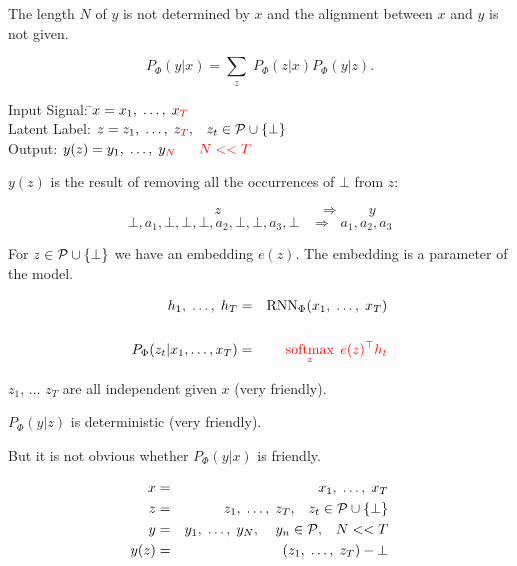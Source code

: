 {\vfill
{\color{red} The length $N$ of $y$ is not determined by $x$ and the alignment between $x$ and $y$ is not given.}


{\color{red} $$P_\Phi(y|x) = \sum_z\;P_\Phi(z|x)P_\Phi(y|z).$$}

\vfill
\begin{tabbing}
Input Signal: \hspace{3em} \=$x = x_1,\;\ldots,\;x_{\color{red} T}$ \\
Latent Label: \>$z = z_1,\;\ldots,\;z_{\color{red} T},\;\;\;z_t \in {\cal P} \cup \{\bot\}$ \\
Output: \>$y(z) = y_1,\;\ldots,\;y_{\color{red} N}\;\;\;\;\;\;{\color{red} N << T}$
\end{tabbing}

\vfill
$y(z)$ is the result of removing all the occurrences of $\bot$ from $z$:

{\color{red} $$\hspace{5em} z \hspace{7em} \Rightarrow \hspace{2em} y$$}
{\color{red} $$\bot,a_1,\bot,\bot,\bot,a_2,\bot,\bot,a_3,\bot \;\;\;\Rightarrow\;\; a_1,a_2,a_3$$}



For $z \in {\cal P} \cup \{\bot\}$ we have an embedding $e(z)$.  The embedding is a parameter of the model.

\begin{eqnarray*}
  h_1,\;\ldots,\;h_T & = & \mathrm{RNN}_\Phi(x_1,\;\ldots,\;x_T) \\
  \\
  P_\Phi(z_t|x_1,\ldots,x_T) & = & {\color{red} \operatorname*{softmax}_{z} \;e(z)^\top h_t}
\end{eqnarray*}

\vfill
$z_1$, $\ldots$ $z_T$ are {\color{red}  all independent} given $x$ (very friendly).

\vfill
$P_\Phi(y|z)$ is {\color{red} deterministic} (very friendly).

\vfill
{\color{red} But it is not obvious whether $P_\Phi(y|x)$ is friendly.}


\begin{eqnarray*}
  x & = & x_1,\;\ldots,\; x_T \\
  z & = & z_1, \;\ldots,\;z_T,\;\;\;z_t \in {\cal P}\cup \{\bot\} \\
  y & = & y_1,\;\ldots,\;y_N,\;\;\;\;y_n \in {\cal P},\;\;\;N << T \\
  y(z) & = & (z_1,\;\ldots,\;z_T) - \bot
\end{eqnarray*}

}
